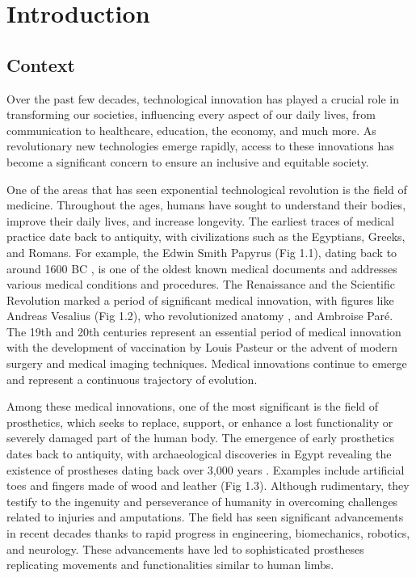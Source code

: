 \chapter{Introduction}
\section{Context}
Over the past few decades, technological innovation has played a crucial role in transforming our societies, influencing every aspect of our daily lives, from communication to healthcare, education, the economy, and much more. As revolutionary new technologies emerge rapidly, access to these innovations has become a significant concern to ensure an inclusive and equitable society.

One of the areas that has seen exponential technological revolution is the field of medicine. Throughout the ages, humans have sought to understand their bodies, improve their daily lives, and increase longevity. The earliest traces of medical practice date back to antiquity, with civilizations such as the Egyptians, Greeks, and Romans. For example, the Edwin Smith Papyrus (Fig 1.1), dating back to around 1600 BC \cite{van_middendorp_edwin_2010}, is one of the oldest known medical documents and addresses various medical conditions and procedures. The Renaissance and the Scientific Revolution marked a period of significant medical innovation, with figures like Andreas Vesalius (Fig 1.2), who revolutionized anatomy \cite{zampieri_andreas_2015}, and Ambroise Paré. The 19th and 20th centuries represent an essential period of medical innovation with the development of vaccination by Louis Pasteur or the advent of modern surgery and medical imaging techniques. Medical innovations continue to emerge and represent a continuous trajectory of evolution.

Among these medical innovations, one of the most significant is the field of prosthetics, which seeks to replace, support, or enhance a lost functionality or severely damaged part of the human body. The emergence of early prosthetics dates back to antiquity, with archaeological discoveries in Egypt revealing the existence of prostheses dating back over 3,000 years \cite{noauthor_prosthesis_2023}. Examples include artificial toes and fingers made of wood and leather (Fig 1.3). Although rudimentary, they testify to the ingenuity and perseverance of humanity in overcoming challenges related to injuries and amputations. The field has seen significant advancements in recent decades thanks to rapid progress in engineering, biomechanics, robotics, and neurology. These advancements have led to sophisticated prostheses replicating movements and functionalities similar to human limbs.


